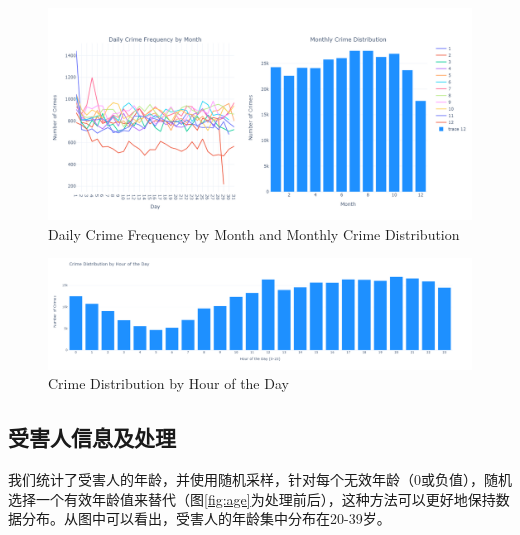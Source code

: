 \documentclass{article}
\begin{document}
\begin{figure}[H]
    \centering
    \includegraphics[width=1\textwidth]{../pic/date.png}
    \caption{Daily Crime Frequency by Month and Monthly Crime Distribution}
    \label{fig:date}
\end{figure}

\begin{figure}[H]
    \centering
    \includegraphics[width=1\textwidth]{../pic/hour.png}
    \caption{Crime Distribution by Hour of the Day}
    \label{fig:hour}
\end{figure}

\subsection{受害人信息及处理}
我们统计了受害人的年龄，并使用随机采样，针对每个无效年龄（0或负值），随机选择一个有效年龄值来替代（图\ref{fig:age}为处理前后），这种方法可以更好地保持数据分布。从图中可以看出，受害人的年龄集中分布在20-39岁。
\end{document}
